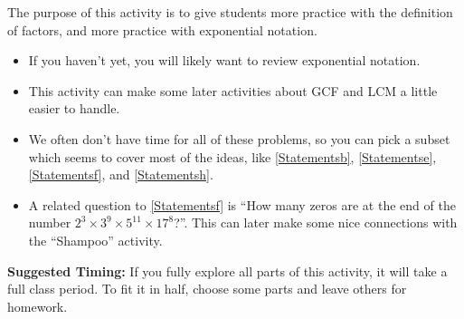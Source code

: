 \documentclass{ximera}
\begin{document}
\newpage
\begin{instructorNotes}
The purpose of this activity is to give students more practice with the definition of factors, and more practice with exponential notation.

\begin{itemize}
    \item If you haven't yet, you will likely want to review exponential notation.
    \item This activity can make some later activities about GCF and LCM a little easier to handle.
\item We often don't have time for all of these problems, so you can pick a subset which seems to cover most of the ideas, like \ref{Statementsb}, \ref{Statementse}, \ref{Statementsf}, and \ref{Statementsh}.
\item A related question to \ref{Statementsf} is ``How many zeros are at the end of the number $2^3\times 3^9\times 5^{11} \times 17^8$?''.  This can later make some nice connections with the ``Shampoo'' activity.
\end{itemize}







{\bf Suggested Timing:} If you fully explore all parts of this activity, it will take a full class period.  To fit it in half, choose some parts and leave others for homework.
\end{instructorNotes}
\end{document}
